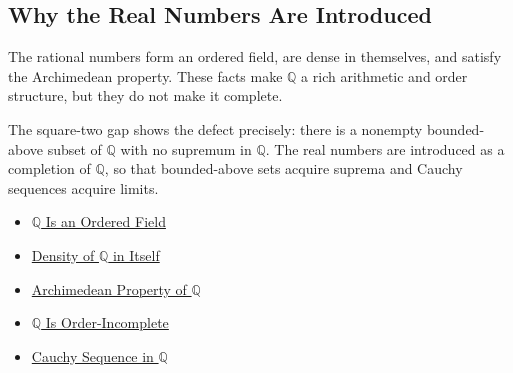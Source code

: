 \subsection*{Why the Real Numbers Are Introduced}

\begin{remark}
\label{rem:why-real-numbers-are-introduced}
The rational numbers form an ordered field, are dense in themselves, and
satisfy the Archimedean property. These facts make $\mathbb{Q}$ a rich
arithmetic and order structure, but they do not make it complete.

The square-two gap shows the defect precisely: there is a nonempty
bounded-above subset of $\mathbb{Q}$ with no supremum in $\mathbb{Q}$. The real
numbers are introduced as a completion of $\mathbb{Q}$, so that bounded-above
sets acquire suprema and Cauchy sequences acquire limits.
\end{remark}

\begin{dependencies}
\begin{itemize}
  \item \hyperref[thm:q-is-an-ordered-field]{$\mathbb{Q}$ Is an Ordered Field}
  \item \hyperref[thm:density-of-q]{Density of $\mathbb{Q}$ in Itself}
  \item \hyperref[thm:archimedean-property-of-q]{Archimedean Property of $\mathbb{Q}$}
  \item \hyperref[cor:q-order-incomplete]{$\mathbb{Q}$ Is Order-Incomplete}
  \item \hyperref[def:cauchy-sequence-in-q]{Cauchy Sequence in $\mathbb{Q}$}
\end{itemize}
\end{dependencies}
